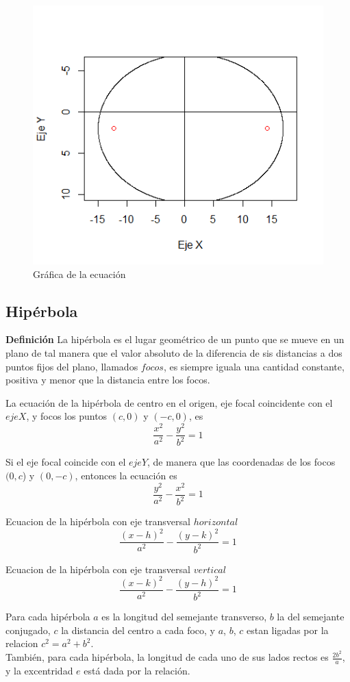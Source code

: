 \documentclass[12pt,a4paper]{article} %
\begin{document}
\begin{figure}[ht]
\centering
\includegraphics[scale=0.7]{Elipse2}
\caption{Gráfica de la ecuación }
\label{fig:Elpise2}
\end{figure}



\newpage

\subsection{Hipérbola}
\textbf{Definición} La hipérbola es el lugar geométrico de un punto que se mueve en un plano de tal manera que el valor absoluto de la diferencia de sis distancias a dos puntos fijos del plano, llamados $focos$, es siempre iguala una cantidad constante, positiva y menor que la distancia entre los focos.

La ecuación de la hipérbola de centro en el origen, eje focal coincidente con el $eje X$, y focos los puntos $(c,0)$ y $(-c,0)$, es
$$ {\frac{x^2}{a^2} - \frac{y^2}{b^2} = 1} $$

Si el eje focal coincide con el $eje Y$, de manera que las coordenadas de los focos $(0,c$) y $(0,-c)$, entonces la ecuación es 
$$ {\frac{y^2}{a^2} - \frac{x^2}{b^2} = 1} $$

Ecuacion de la hipérbola con eje transversal $horizontal$
$$ {\frac{(x - h)^2}{a^2} - \frac{(y - k)^2}{b^2} = 1} $$

Ecuacion de la hipérbola con eje transversal $vertical$
$$ {\frac{(x - k)^2}{a^2} - \frac{(y - h)^2}{b^2} = 1} $$

\citep{geometria}Para cada hipérbola $a$ es la longitud del semejante transverso, $b$ la del semejante conjugado, $c$ la distancia del centro a cada foco, y $a$, $b$, $c$ estan ligadas por la relacion $c^2 = a^2 + b^2$.
\\También, para cada hipérbola, la longitud de cada uno de sus lados rectos es $\frac{2b^2}{a}$, y la excentridad $e$ está dada por la relación.
\end{document}
